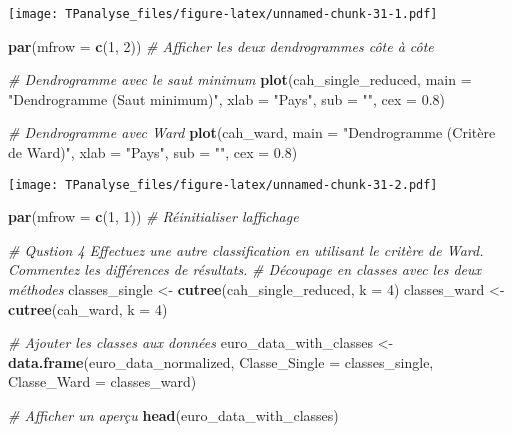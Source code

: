 \documentclass[
]{article}
\newenvironment{Shaded}{\begin{snugshade}}{\end{snugshade}}
\newcommand{\AttributeTok}[1]{\textcolor[rgb]{0.13,0.29,0.53}{#1}}
\newcommand{\CommentTok}[1]{\textcolor[rgb]{0.56,0.35,0.01}{\textit{#1}}}
\newcommand{\DecValTok}[1]{\textcolor[rgb]{0.00,0.00,0.81}{#1}}
\newcommand{\FloatTok}[1]{\textcolor[rgb]{0.00,0.00,0.81}{#1}}
\newcommand{\FunctionTok}[1]{\textcolor[rgb]{0.13,0.29,0.53}{\textbf{#1}}}
\newcommand{\NormalTok}[1]{#1}
\newcommand{\OtherTok}[1]{\textcolor[rgb]{0.56,0.35,0.01}{#1}}
\newcommand{\StringTok}[1]{\textcolor[rgb]{0.31,0.60,0.02}{#1}}
\begin{document}
\texttt{[image: TPanalyse\_files/figure-latex/unnamed-chunk-31-1.pdf]}

\begin{Shaded}
\begin{Highlighting}[]
\FunctionTok{par}\NormalTok{(}\AttributeTok{mfrow =} \FunctionTok{c}\NormalTok{(}\DecValTok{1}\NormalTok{, }\DecValTok{2}\NormalTok{))  }\CommentTok{\# Afficher les deux dendrogrammes côte à côte}

\CommentTok{\# Dendrogramme avec le saut minimum}
\FunctionTok{plot}\NormalTok{(cah\_single\_reduced, }
     \AttributeTok{main =} \StringTok{"Dendrogramme (Saut minimum)"}\NormalTok{, }
     \AttributeTok{xlab =} \StringTok{"Pays"}\NormalTok{, }\AttributeTok{sub =} \StringTok{""}\NormalTok{, }\AttributeTok{cex =} \FloatTok{0.8}\NormalTok{)}

\CommentTok{\# Dendrogramme avec Ward}
\FunctionTok{plot}\NormalTok{(cah\_ward, }
     \AttributeTok{main =} \StringTok{"Dendrogramme (Critère de Ward)"}\NormalTok{, }
     \AttributeTok{xlab =} \StringTok{"Pays"}\NormalTok{, }\AttributeTok{sub =} \StringTok{""}\NormalTok{, }\AttributeTok{cex =} \FloatTok{0.8}\NormalTok{)}
\end{Highlighting}
\end{Shaded}

\texttt{[image: TPanalyse\_files/figure-latex/unnamed-chunk-31-2.pdf]}

\begin{Shaded}
\begin{Highlighting}[]
\FunctionTok{par}\NormalTok{(}\AttributeTok{mfrow =} \FunctionTok{c}\NormalTok{(}\DecValTok{1}\NormalTok{, }\DecValTok{1}\NormalTok{))  }\CommentTok{\# Réinitialiser l\textquotesingle{}affichage}
\end{Highlighting}
\end{Shaded}

\begin{Shaded}
\begin{Highlighting}[]
\CommentTok{\# Qustion 4  Effectuez une autre classification en utilisant le critère de Ward. Commentez les différences de résultats.}
\CommentTok{\# Découpage en classes avec les deux méthodes}
\NormalTok{classes\_single }\OtherTok{\textless{}{-}} \FunctionTok{cutree}\NormalTok{(cah\_single\_reduced, }\AttributeTok{k =} \DecValTok{4}\NormalTok{)}
\NormalTok{classes\_ward }\OtherTok{\textless{}{-}} \FunctionTok{cutree}\NormalTok{(cah\_ward, }\AttributeTok{k =} \DecValTok{4}\NormalTok{)}

\CommentTok{\# Ajouter les classes aux données}
\NormalTok{euro\_data\_with\_classes }\OtherTok{\textless{}{-}} \FunctionTok{data.frame}\NormalTok{(euro\_data\_normalized, }\AttributeTok{Classe\_Single =}\NormalTok{ classes\_single, }\AttributeTok{Classe\_Ward =}\NormalTok{ classes\_ward)}

\CommentTok{\# Afficher un aperçu}
\FunctionTok{head}\NormalTok{(euro\_data\_with\_classes)}
\end{Highlighting}
\end{Shaded}
\end{document}
